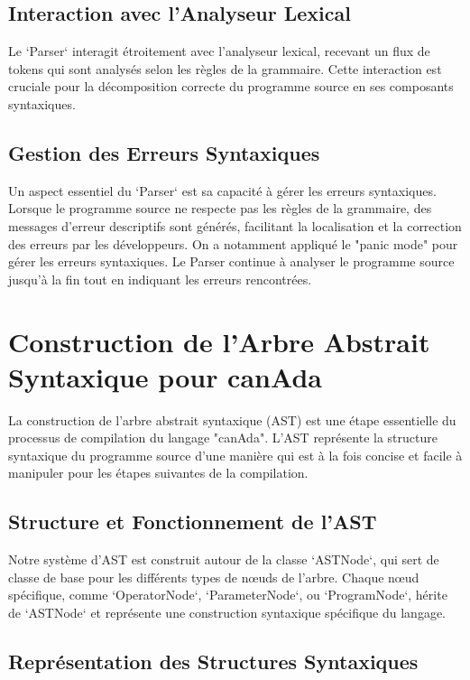 \documentclass[french,a4paper]{article}
\begin{document}
    \subsection{Interaction avec l'Analyseur Lexical}

    Le `Parser` interagit étroitement avec l'analyseur lexical, recevant un flux de tokens qui sont analysés selon les règles de la grammaire. Cette interaction est cruciale pour la décomposition correcte du programme source en ses composants syntaxiques.

    \subsection{Gestion des Erreurs Syntaxiques}

    Un aspect essentiel du `Parser` est sa capacité à gérer les erreurs syntaxiques. Lorsque le programme source ne respecte pas les règles de la grammaire, des messages d'erreur descriptifs sont générés, facilitant la localisation et la correction des erreurs par les développeurs. On a notamment appliqué le "panic mode" pour gérer les erreurs syntaxiques. Le Parser continue à analyser le programme source jusqu'à la fin tout en indiquant les erreurs rencontrées.

    \section{Construction de l'Arbre Abstrait Syntaxique pour canAda}

    La construction de l'arbre abstrait syntaxique (AST) est une étape essentielle du processus de compilation du langage "canAda". L'AST représente la structure syntaxique du programme source d'une manière qui est à la fois concise et facile à manipuler pour les étapes suivantes de la compilation.

    \subsection{Structure et Fonctionnement de l'AST}

    Notre système d'AST est construit autour de la classe `ASTNode`, qui sert de classe de base pour les différents types de nœuds de l'arbre. Chaque nœud spécifique, comme `OperatorNode`, `ParameterNode`, ou `ProgramNode`, hérite de `ASTNode` et représente une construction syntaxique spécifique du langage.

    \subsection{Représentation des Structures Syntaxiques}
\end{document}
